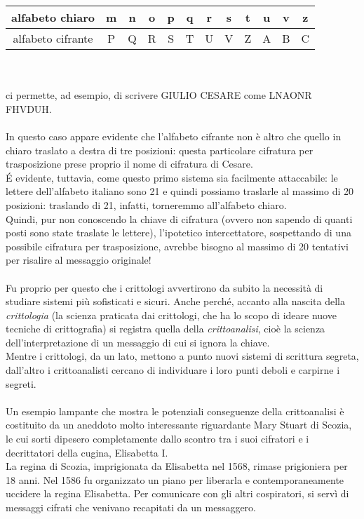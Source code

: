 \begin{tabular}{ | c | c | c | c | c | c | c | c | c | c | c | c | }
\hline
alfabeto chiaro & m & n & o & p & q & r & s & t & u & v & z \\
\hline
alfabeto cifrante & P & Q & R & S & T & U & V & Z & A & B & C \\
\hline
\end{tabular}\\\\
ci permette, ad esempio, di scrivere GIULIO CESARE come LNAONR FHVDUH.\\\\
In questo caso appare evidente che l’alfabeto cifrante non è altro che quello in chiaro traslato a destra di tre posizioni: questa particolare cifratura per trasposizione prese proprio il nome di cifratura di Cesare.\\
\'E evidente, tuttavia, come questo primo sistema sia facilmente attaccabile: le lettere dell’alfabeto italiano sono 21 e quindi possiamo traslarle al massimo di 20 posizioni: traslando di 21, infatti, torneremmo all’alfabeto chiaro.\\
Quindi, pur non conoscendo la chiave di cifratura (ovvero non sapendo di quanti posti sono state traslate le lettere), l'ipotetico intercettatore, sospettando di una possibile cifratura per trasposizione, avrebbe bisogno al massimo di 20 tentativi per risalire al messaggio originale!\\\\
Fu proprio per questo che i crittologi avvertirono da subito la necessità di studiare sistemi più sofisticati e sicuri. Anche perché, accanto alla nascita della \emph{crittologia} (la scienza praticata dai crittologi, che ha lo scopo di ideare nuove tecniche di crittografia) si registra quella della \emph{crittoanalisi}, cioè la scienza
dell’interpretazione di un messaggio di cui si ignora la chiave.\\
Mentre i crittologi, da un lato, mettono a punto nuovi sistemi di scrittura segreta, dall’altro i crittoanalisti cercano di individuare i loro punti deboli e carpirne i segreti.\\\\
Un esempio lampante che mostra le potenziali conseguenze della crittoanalisi è costituito da un aneddoto molto interessante riguardante Mary Stuart di Scozia, le cui sorti dipesero completamente dallo scontro tra i suoi cifratori e i decrittatori della cugina, Elisabetta I.\\
La regina di Scozia, imprigionata da Elisabetta nel 1568, rimase prigioniera per 18 anni. Nel 1586 fu organizzato un piano per liberarla e contemporaneamente uccidere la regina Elisabetta. Per comunicare con gli altri cospiratori, si servì di messaggi cifrati che venivano recapitati da un messaggero.\\
